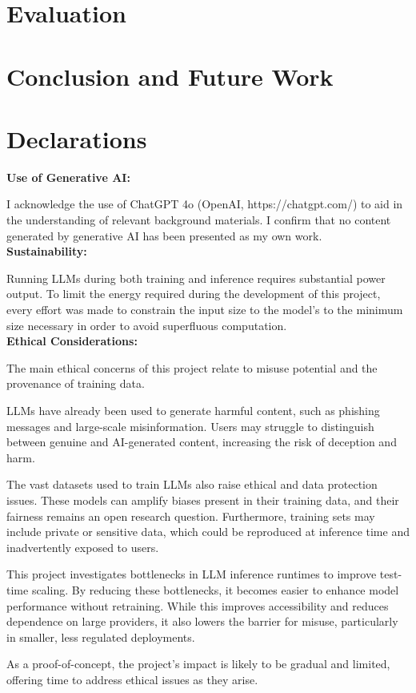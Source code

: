 \documentclass[11pt,twoside]{report}
\begin{document}
\chapter{Evaluation}

\chapter{Conclusion and Future Work}

\chapter{Declarations}
\textbf{Use of Generative AI:} 

I acknowledge the use of ChatGPT 4o (OpenAI, https://chatgpt.com/) to aid in the understanding of relevant background materials. 
I confirm that no content generated by generative AI has been presented as my own work. \\

\textbf{Sustainability:} 

Running LLMs during both training and inference requires substantial power output.
To limit the energy required during the development of this project, every effort was made to constrain the input size to the model's to the minimum size necessary in order to avoid superfluous computation. \\

\textbf{Ethical Considerations:}

The main ethical concerns of this project relate to misuse potential and the provenance of training data.

LLMs have already been used to generate harmful content, such as phishing messages and large-scale misinformation. 
Users may struggle to distinguish between genuine and AI-generated content, increasing the risk of deception and harm.

The vast datasets used to train LLMs also raise ethical and data protection issues. 
These models can amplify biases present in their training data, and their fairness remains an open research question. 
Furthermore, training sets may include private or sensitive data, which could be reproduced at inference time and inadvertently exposed to users.

This project investigates bottlenecks in LLM inference runtimes to improve test-time scaling. 
By reducing these bottlenecks, it becomes easier to enhance model performance without retraining. 
While this improves accessibility and reduces dependence on large providers, it also lowers the barrier for misuse, particularly in smaller, less regulated deployments.

As a proof-of-concept, the project’s impact is likely to be gradual and limited, offering time to address ethical issues as they arise.
\end{document}
